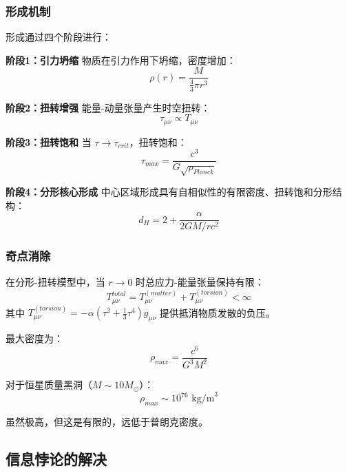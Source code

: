 \subsubsection{形成机制}

形成通过四个阶段进行：

\textbf{阶段1：引力坍缩}
物质在引力作用下坍缩，密度增加：
\begin{equation}
    \rho(r) = \frac{M}{\frac{4}{3}\pi r^3}
\end{equation}

\textbf{阶段2：扭转增强}
能量-动量张量产生时空扭转：
\begin{equation}
    \tau_{\mu\nu} \propto T_{\mu\nu}
\end{equation}

\textbf{阶段3：扭转饱和}
当 $\tau \to \tau_{crit}$，扭转饱和：
\begin{equation}
    \tau_{max} = \frac{c^3}{G\sqrt{\rho_{Planck}}}
\end{equation}

\textbf{阶段4：分形核心形成}
中心区域形成具有自相似性的有限密度、扭转饱和分形结构：
\begin{equation}
    d_H = 2 + \frac{\alpha}{2GM/rc^2}
\end{equation}

\subsubsection{奇点消除}

\begin{theorem}[规则核心定理]
在分形-扭转模型中，当 $r \to 0$ 时总应力-能量张量保持有限：
\begin{equation}
    T^{total}_{\mu\nu} = T^{(matter)}_{\mu\nu} + T^{(torsion)}_{\mu\nu} < \infty
\end{equation}
其中 $T^{(torsion)}_{\mu\nu} = -\alpha(\tau^2 + \frac{1}{3}\tau^4)g_{\mu\nu}$ 提供抵消物质发散的负压。
\end{theorem}

最大密度为：
\begin{equation}
    \rho_{max} = \frac{c^6}{G^3M^2}
\end{equation}

对于恒星质量黑洞（$M \sim 10M_\odot$）：
\begin{equation}
    \rho_{max} \sim 10^{76} \text{ kg/m}^3
\end{equation}

虽然极高，但这是有限的，远低于普朗克密度。

\subsection{信息悖论的解决}

